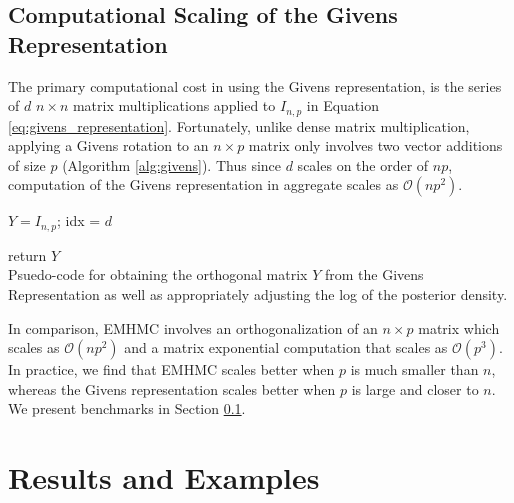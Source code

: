 \documentclass[ba]{imsart}
\numberwithin{equation}{section}
\theoremstyle{plain}
\begin{document}
\subsection{Computational Scaling of the Givens Representation}\label{scaling}
The primary computational cost in using the Givens representation, is the series of $d$ $n \times n$ matrix multiplications applied to $I_{n,p}$ in 
Equation \ref{eq:givens_representation}. Fortunately, unlike dense matrix multiplication, applying a Givens rotation to an $n \times p$ matrix only involves two vector additions of size $p$ (Algorithm \ref{alg:givens}). Thus since $d$ scales on the order of $np$, computation of the Givens representation in aggregate scales as $\mathcal{O}(np^2)$.

\begin{algorithm}[h]
\SetAlgoLined
\KwIn{$\theta$}
$Y = I_{n,p}$;
 idx = $d$
 
return $Y$
\\
\caption{Psuedo-code for obtaining the orthogonal matrix $Y$ from the Givens Representation as well as appropriately adjusting the log of the posterior density.}
 \label{alg:givens}
\end{algorithm}

\noindent In comparison, EMHMC involves an orthogonalization of an $n \times p$ matrix which scales as $\mathcal{O}(np^2)$ and a matrix exponential computation that scales as $\mathcal{O}(p^3)$. In practice, we find that EMHMC scales better when $p$ is much smaller than $n$, whereas the Givens representation scales better when $p$ is large and closer to $n$. We present benchmarks in Section \ref{scaling}.

\section{Results and Examples} \label{examples}
\end{document}
